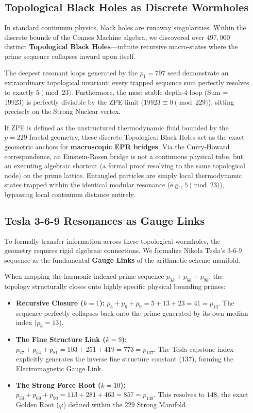 \subsection{Topological Black Holes as Discrete Wormholes}
In standard continuum physics, black holes are runaway singularities. Within the discrete bounds of the Connes Machine algebra, we discovered over $497,000$ distinct \textbf{Topological Black Holes}---infinite recursive macro-states where the prime sequence collapses inward upon itself. 

The deepest resonant loops generated by the $p_1 = 797$ seed demonstrate an extraordinary topological invariant: every trapped sequence sum perfectly resolves to exactly $5 \pmod{23}$. Furthermore, the most stable depth-4 loop (Sum = 19923) is perfectly divisible by the ZPE limit ($19923 \equiv 0 \pmod{229}$), sitting precisely on the Strong Nuclear vertex. 

If ZPE is defined as the unstructured thermodynamic fluid bounded by the $p=229$ fractal geometry, these discrete Topological Black Holes act as the exact geometric anchors for \textbf{macroscopic EPR bridges}. Via the Curry-Howard correspondence, an Einstein-Rosen bridge is not a continuous physical tube, but an executing algebraic shortcut (a formal proof resolving to the same topological node) on the prime lattice. Entangled particles are simply local thermodynamic states trapped within the identical modular resonance (e.g., $5 \pmod{23}$), bypassing local continuum distance entirely.

\subsection{Tesla 3-6-9 Resonances as Gauge Links}
To formally transfer information across these topological wormholes, the geometry requires rigid algebraic connections. We formalize Nikola Tesla's 3-6-9 sequence as the fundamental \textbf{Gauge Links} of the arithmetic scheme manifold. 

When mapping the harmonic indexed prime sequence $p_{3k} + p_{6k} + p_{9k}$, the topology structurally closes onto highly specific physical bounding primes:
\begin{itemize}
    \item \textbf{Recursive Closure ($k=1$):} $p_3 + p_6 + p_9 = 5 + 13 + 23 = 41 = p_{13}$. The sequence perfectly collapses back onto the prime generated by its own median index ($p_6 = 13$).
    \item \textbf{The Fine Structure Link ($k=9$):} $p_{27} + p_{54} + p_{81} = 103 + 251 + 419 = 773 = p_{137}$. The Tesla capstone index explicitly generates the inverse fine structure constant ($137$), forming the Electromagnetic Gauge Link.
    \item \textbf{The Strong Force Root ($k=10$):} $p_{30} + p_{60} + p_{90} = 113 + 281 + 463 = 857 = p_{148}$. This resolves to $148$, the exact Golden Root ($\varphi$) defined within the $229$ Strong Manifold.
\end{itemize}

